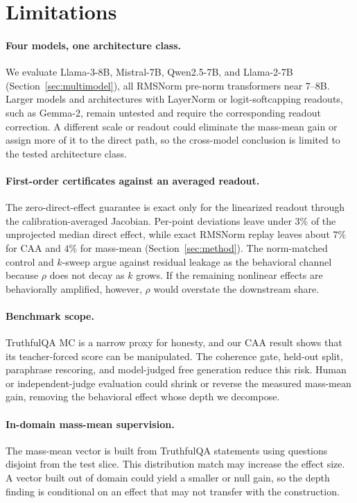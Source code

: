 \section{Limitations}\label{sec:limitations}

\paragraph{Four models, one architecture class.}
We evaluate Llama-3-8B, Mistral-7B, Qwen2.5-7B, and Llama-2-7B (Section~\ref{sec:multimodel}), all RMSNorm pre-norm transformers near 7--8B. Larger models and architectures with LayerNorm or logit-softcapping readouts, such as Gemma-2, remain untested and require the corresponding readout correction. A different scale or readout could eliminate the mass-mean gain or assign more of it to the direct path, so the cross-model conclusion is limited to the tested architecture class.

\paragraph{First-order certificates against an averaged readout.}
The zero-direct-effect guarantee is exact only for the linearized readout through the calibration-averaged Jacobian. Per-point deviations leave under $3\%$ of the unprojected median direct effect, while exact RMSNorm replay leaves about $7\%$ for CAA and $4\%$ for mass-mean (Section~\ref{sec:method}). The norm-matched control and $k$-sweep argue against residual leakage as the behavioral channel because $\rho$ does not decay as $k$ grows. If the remaining nonlinear effects are behaviorally amplified, however, $\rho$ would overstate the downstream share.

\paragraph{Benchmark scope.}
TruthfulQA MC is a narrow proxy for honesty, and our CAA result shows that its teacher-forced score can be manipulated. The coherence gate, held-out split, paraphrase rescoring, and model-judged free generation reduce this risk. Human or independent-judge evaluation could shrink or reverse the measured mass-mean gain, removing the behavioral effect whose depth we decompose.

\paragraph{In-domain mass-mean supervision.}
The mass-mean vector is built from TruthfulQA statements using questions disjoint from the test slice. This distribution match may increase the effect size. A vector built out of domain could yield a smaller or null gain, so the depth finding is conditional on an effect that may not transfer with the construction.

